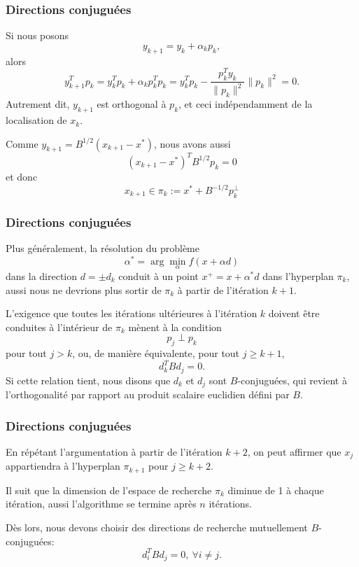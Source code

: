 \documentclass[usepdftitle=false]{beamer}
\begin{document}
\begin{frame}
\frametitle{Directions conjuguées}

Si nous posons
$$
y_{k+1} = y_k + \alpha_k p_k,
$$
alors
$$
y_{k+1}^T p_k = y_k^Tp_k + \alpha_k p_k^T p_k
= y_k^Tp_k -\frac{p_k^T y_k}{\| p_k \|^2} \| p_k \|^2 = 0.
$$
Autrement dit, $y_{k+1}$ est orthogonal à $p_k$, et ceci indépendamment de la localisation de $x_k$.

\mbox{}

Comme $y_{k+1} = B^{1/2}(x_{k+1}-x^*)$, nous avons aussi
$$
(x_{k+1}-x^*)^TB^{1/2} p_k = 0
$$
et donc
$$
x_{k+1} \in \pi_k := x^* + B^{-1/2} p_k^{\perp}
$$

\end{frame}

\begin{frame}
\frametitle{Directions conjuguées}

Plus généralement, la résolution du problème
$$
\alpha^* = \arg \min_{\alpha} f (x + \alpha d)
$$
dans la direction $d = \pm d_k$ conduit à un point $x^+ = x + \alpha^* d$ dans l'hyperplan $\pi_k$, aussi nous ne devrions plus sortir de $\pi_k$ à partir de l'itération $k+1$.

\mbox{}

L'exigence que toutes les itérations ultérieures à l'itération $k$ doivent être conduites à l'intérieur de $\pi_k$ mènent à la condition
$$
p_j \perp p_k
$$
pour tout $j > k$, ou, de manière équivalente, pour tout $j \geq k + 1$,
$$
d^T_k B d_j = 0.
$$
Si cette relation tient, nous disons que $d_k$ et $d_j$ sont $B$-conjuguées, qui revient à l'orthogonalité par rapport au produit scalaire euclidien défini par $B$.

\end{frame}

\begin{frame}
\frametitle{Directions conjuguées}

En répétant l'argumentation à partir de l'itération $k+2$, on peut affirmer que $x_j$ appartiendra à l'hyperplan $\pi_{k+1}$ pour $j \geq k+2$.

\mbox{}

Il suit que la dimension de l'espace de recherche $\pi_k$ diminue de 1 à chaque itération, aussi l'algorithme se termine après $n$ itérations.

\mbox{}

Dès lors, nous devons choisir des directions de recherche mutuellement $B$-conjuguées:
$$
d_i^T B d_j = 0,\ \forall i \ne j.
$$

\end{frame}
\end{document}
